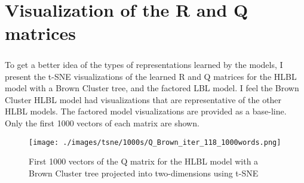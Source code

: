
\chapter{Visualization of the R and Q matrices}
\paragraph{}
To get a better idea of the types of representations learned by the models, I present the t-SNE visualizations of the learned R and Q matrices for the HLBL model with a Brown Cluster tree, and the factored LBL model. I feel the Brown Cluster HLBL model had visualizations that are representative of the other HLBL models. The factored model visualizations are provided as a base-line. Only the first 1000 vectors of each matrix are shown.



\begin{figure}[h]
\texttt{[image: ./images/tsne/1000s/Q\_Brown\_iter\_118\_1000words.png]} 
\centering
\caption{First 1000 vectors of the Q matrix for the HLBL model with a Brown Cluster tree projected into two-dimensions using t-SNE}
\end{figure}
%
%
%
%

